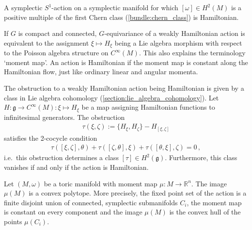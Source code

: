     \begin{property}
        A symplectic $S^1$-action on a symplectic manifold for which $[\omega]\in H^2(M)$ is a positive multiple of the first Chern class (\cref{bundle:chern_class}) is Hamiltonian.
    \end{property}

    \begin{property}[Obstruction]
        If $G$ is compact and connected, $G$-equivariance of a weakly Hamiltonian action is equivalent to the assignment $\xi\mapsto H_\xi$ being a Lie algebra morphism with respect to the Poisson algebra structure on $C^\infty(M)$. This also explains the terminology `moment map'. An action is Hamiltonian if the moment map is constant along the Hamiltonian flow, just like ordinary linear and angular momenta.

        The obstruction to a weakly Hamiltonian action being Hamiltonian is given by a class in Lie algebra cohomology (\cref{section:lie_algebra_cohomology}). Let $H:\mathfrak{g}\rightarrow C^\infty(M):\xi\mapsto H_\xi$ be a map assigning Hamiltonian functions to infinitesimal generators. The obstruction
        \begin{gather}
            \tau(\xi,\zeta) := \{H_\xi,H_\zeta\} - H_{[\xi,\zeta]}
        \end{gather}
        satisfies the 2-cocycle condition
        \begin{gather}
            \tau([\xi,\zeta],\theta) + \tau([\zeta,\theta],\xi) + \tau([\theta,\xi],\zeta) = 0\,,
        \end{gather}
        i.e.~this obstruction determines a class $[\tau]\in H^2(\mathfrak{g})$. Furthermore, this class vanishes if and only if the action is Hamiltonian.
    \end{property}

    \begin{theorem}
        Let $(M,\omega)$ be a toric manifold with moment map $\mu:M\rightarrow\mathbb{R}^n$. The image $\mu(M)$ is a convex polytope. More precisely, the fixed point set of the action is a finite disjoint union of connected, symplectic submanifolds $C_i$, the moment map is constant on every component and the image $\mu(M)$ is the convex hull of the points $\mu(C_i)$.
    \end{theorem}

